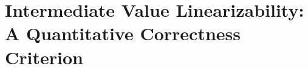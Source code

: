\chapter{Intermediate Value Linearizability: A Quantitative Correctness Criterion}
\label{chap:ivl}













